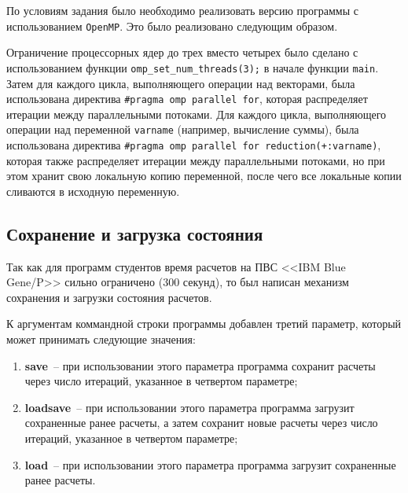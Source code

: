 По условиям задания было необходимо реализовать версию программы с использованием \texttt{OpenMP}. Это было реализовано следующим образом.

Ограничение процессорных ядер до трех вместо четырех было сделано с использованием функции \texttt{omp\_set\_num\_threads(3);} в начале функции \texttt{main}. Затем для каждого цикла, выполняющего операции над векторами, была использована директива \texttt{\#pragma omp parallel for}, которая распределяет итерации между параллельными потоками. Для каждого цикла, выполняющего операции над переменной \texttt{varname} (например, вычисление суммы), была использована директива \texttt{\#pragma omp parallel for reduction(+:varname)}, которая также распределяет итерации между параллельными потоками, но при этом хранит свою локальную копию переменной, после чего все локальные копии сливаются в исходную переменную.

\subsection{Сохранение и загрузка состояния}

Так как для программ студентов время расчетов на ПВС <<IBM Blue Gene/P>> сильно ограничено (300 секунд), то был написан механизм сохранения и загрузки состояния расчетов.

К аргументам коммандной строки программы добавлен третий параметр, который может принимать следующие значения:
\begin{enumerate}[label=\arabic*)]
  \item \textbf{save}~-- при использовании этого параметра программа сохранит расчеты через число итераций, указанное в четвертом параметре;
  \item \textbf{loadsave}~-- при использовании этого параметра программа загрузит сохраненные ранее расчеты, а затем сохранит новые расчеты через число итераций, указанное в четвертом параметре;
  \item \textbf{load}~-- при использовании этого параметра программа загрузит сохраненные ранее расчеты.
\end{enumerate}

\clearpage

